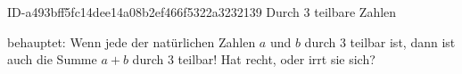 \begin{exercise}
      {ID-a493bff5fc14dee14a08b2ef466f5322a3232139}
      {Durch 3 teilbare Zahlen}
  \ifproblem\problem\par
    \xxb{} behauptet: \glqq Wenn jede der natürlichen Zahlen $a$ und $b$ durch 3
    teilbar ist, dann ist auch die Summe $a+b$ durch 3 teilbar!\grqq{} Hat \xxb{}
    recht, oder irrt sie sich?
  \fi
\end{exercise}
